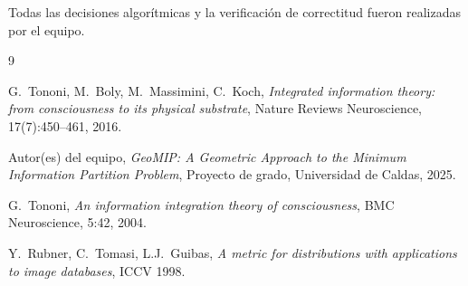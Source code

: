 \documentclass[11pt,letterpaper]{article}
\begin{document}
Todas las decisiones algorítmicas y la verificación de correctitud fueron
realizadas por el equipo.


\begin{thebibliography}{9}

G.~Tononi, M.~Boly, M.~Massimini, C.~Koch,
\textit{Integrated information theory: from consciousness to its physical
substrate},
Nature Reviews Neuroscience, 17(7):450--461, 2016.

Autor(es) del equipo,
\textit{GeoMIP: A Geometric Approach to the Minimum Information Partition
Problem},
Proyecto de grado, Universidad de Caldas, 2025.

G.~Tononi,
\textit{An information integration theory of consciousness},
BMC Neuroscience, 5:42, 2004.

Y.~Rubner, C.~Tomasi, L.J.~Guibas,
\textit{A metric for distributions with applications to image databases},
ICCV 1998.

\end{thebibliography}
\end{document}
